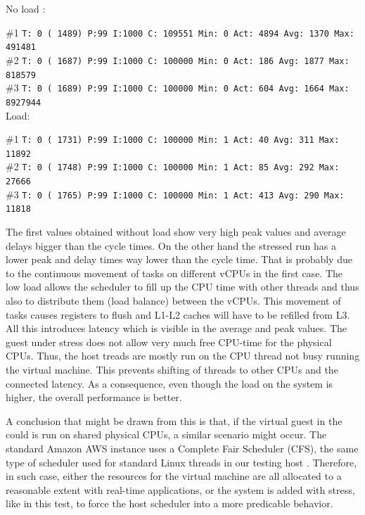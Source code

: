 \documentclass[]{scrartcl}
\begin{document}
\noindent No load :

\noindent \small \#1 \texttt{T: 0 ( 1489) P:99 I:1000 C: 109551 Min: 0 Act: 4894 Avg: 1370 Max:  491481}\\
\noindent \small \#2 \texttt{T: 0 ( 1687) P:99 I:1000 C: 100000 Min: 0 Act:  186 Avg: 1877 Max:  818579}\\
\noindent \small \#3 \texttt{T: 0 ( 1689) P:99 I:1000 C: 100000 Min: 0 Act:  604 Avg: 1664 Max:  8927944}\\

\noindent Load:

\noindent \small \#1 \texttt{T: 0 ( 1731) P:99 I:1000 C: 100000 Min: 1 Act:   40 Avg:  311 Max:   11892}\\
\noindent \small \#2 \texttt{T: 0 ( 1748) P:99 I:1000 C: 100000 Min: 1 Act:   85 Avg:  292 Max:   27666}\\
\noindent \small \#3 \texttt{T: 0 ( 1765) P:99 I:1000 C: 100000 Min: 1 Act:  413 Avg:  290 Max:   11818}

\bigskip

The first values obtained without load show very high peak values and average delays bigger than the cycle times. On the other hand the stressed run has a lower peak and delay times way lower than the cycle time. That is probably due to the continuous movement of tasks on different vCPUs in the first case. 
The low load allows the scheduler to fill up the CPU time with other threads and thus also to distribute them (load balance) between the vCPUs.
This movement of tasks causes registers to flush and L1-L2 caches will have to be refilled from L3. 
All this introduces latency which is visible in the average and peak values.
The guest under stress does not allow very much free CPU-time for the physical CPUs. Thus, the host treads are mostly run on the CPU thread not busy running the virtual machine. This prevents shifting of threads to other CPUs and the connected latency. As a consequence, even though the load on the system is higher, the overall performance is better. 

A conclusion that might be drawn from this is that, if the virtual guest in the could is run on shared physical CPUs, a similar scenario might occur. The standard Amazon AWS instance uses a Complete Fair Scheduler (CFS), the same type of scheduler used for standard Linux threads in our testing host \cite{xen01}.
Therefore, in such case, either the resources for the virtual machine are all allocated to a reasonable extent with real-time applications, or the system is added with stress, like in this test, to force the host scheduler into a more predicable behavior. 
\end{document}
